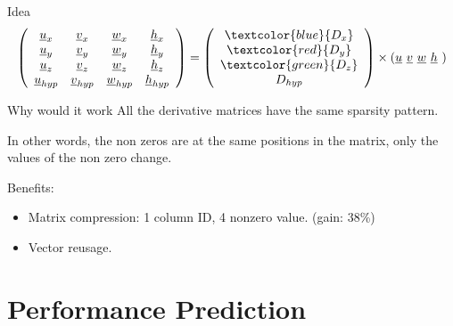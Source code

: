 \documentclass{beamer}
\begin{document}
\begin{frame}
  \begin{block}{Idea}
    \scriptsize
    \begin{equation}
      \left( \begin{array}{cccc}
          \underline{u}_x     & \underline{v}_x     & \underline{w}_x     & \underline{h}_x \\
          \underline{u}_y     & \underline{v}_y     & \underline{w}_y     & \underline{h}_y \\
          \underline{u}_z     & \underline{v}_z     & \underline{w}_z     & \underline{h}_z \\
          \underline{u}_{hyp} & \underline{v}_{hyp} & \underline{w}_{hyp} & \underline{h}_{hyp}
        \end{array} \right)
      = \left(
        \begin{array}{c}
          \textcolor{blue}{D_{x}}\\ \textcolor{red}{D_{y}}\\ \textcolor{green}{D_{z}}\\ D_{hyp}
        \end{array}\right)
      \times \left(\underline{u} \,\, \underline{v} \,\, \underline{w} \,\, \underline{h} \,\,\right) \nonumber
      \vspace{-1ex}
    \end{equation}
  \end{block}  
  
\pause
    
  \begin{block}{Why would it work}
    All the derivative matrices have the same sparsity pattern.

    In other words, the non zeros are at the same positions in the
    matrix, only the values of the non zero change.

    Benefits:
    \begin{itemize}
    \item Matrix compression: 1 column ID, 4 nonzero value. (gain: 38\%)
    \item Vector reusage.
    \end{itemize}
  \end{block}
\end{frame}

\section{Performance Prediction}
\end{document}
